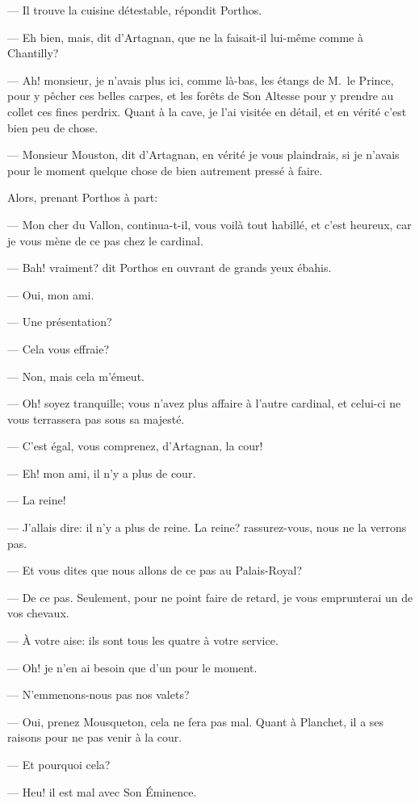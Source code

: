 — Il trouve la cuisine détestable, répondit Porthos.

— Eh bien, mais, dit d'Artagnan, que ne la faisait-il lui-même comme à Chantilly?

— Ah! monsieur, je n'avais plus ici, comme là-bas, les étangs de M.~le Prince, pour y pêcher ces belles carpes, et les forêts de Son Altesse pour y prendre au collet ces fines perdrix. Quant à la cave, je l'ai visitée en détail, et en vérité c'est bien peu de chose.

— Monsieur Mouston, dit d'Artagnan, en vérité je vous plaindrais, si je n'avais pour le moment quelque chose de bien autrement pressé à faire.

Alors, prenant Porthos à part:

— Mon cher du Vallon, continua-t-il, vous voilà tout habillé, et c'est heureux, car je vous mène de ce pas chez le cardinal.

— Bah! vraiment? dit Porthos en ouvrant de grands yeux ébahis.

— Oui, mon ami.

— Une présentation?

— Cela vous effraie?

— Non, mais cela m'émeut.

— Oh! soyez tranquille; vous n'avez plus affaire à l'autre cardinal, et celui-ci ne vous terrassera pas sous sa majesté.

— C'est égal, vous comprenez, d'Artagnan, la cour!

— Eh! mon ami, il n'y a plus de cour.

— La reine!

— J'allais dire: il n'y a plus de reine. La reine? rassurez-vous, nous ne la verrons pas.

— Et vous dites que nous allons de ce pas au Palais-Royal?

— De ce pas. Seulement, pour ne point faire de retard, je vous emprunterai un de vos chevaux.

— À votre aise: ils sont tous les quatre à votre service.

— Oh! je n'en ai besoin que d'un pour le moment.

— N'emmenons-nous pas nos valets?

— Oui, prenez Mousqueton, cela ne fera pas mal. Quant à Planchet, il a ses raisons pour ne pas venir à la cour.

— Et pourquoi cela?

— Heu! il est mal avec Son Éminence.


